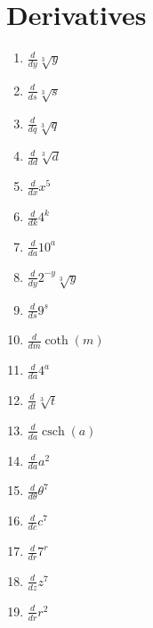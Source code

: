 \documentclass[10pt,twocolumn]{article}
\begin{document}
\section{Derivatives}
\begin{enumerate}
\item \(\frac{d}{d y} \sqrt[3]{y}\)
\item \(\frac{d}{d s} \sqrt[3]{s}\)
\item \(\frac{d}{d q} \sqrt[3]{q}\)
\item \(\frac{d}{d d} \sqrt[3]{d}\)
\item \(\frac{d}{d x} x^{5}\)
\item \(\frac{d}{d k} 4^{k}\)
\item \(\frac{d}{d a} 10^{a}\)
\item \(\frac{d}{d y} 2^{- y} \sqrt[3]{y}\)
\item \(\frac{d}{d s} 9^{s}\)
\item \(\frac{d}{d m} \coth{\left(m \right)}\)
\item \(\frac{d}{d a} 4^{a}\)
\item \(\frac{d}{d t} \sqrt[3]{t}\)
\item \(\frac{d}{d a} \operatorname{csch}{\left(a \right)}\)
\item \(\frac{d}{d a} a^{2}\)
\item \(\frac{d}{d \theta} \theta^{7}\)
\item \(\frac{d}{d c} c^{7}\)
\item \(\frac{d}{d r} 7^{r}\)
\item \(\frac{d}{d z} z^{7}\)
\item \(\frac{d}{d r} r^{2}\)
\end{enumerate}
\newpage
\end{document}
